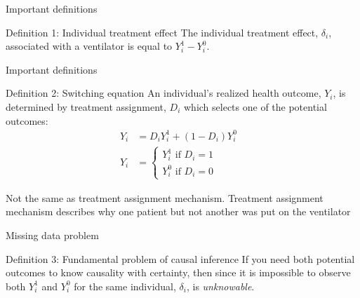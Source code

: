 \documentclass{beamer}
\begin{document}
\begin{frame}{Important definitions}

    \begin{block}{Definition 1: Individual treatment effect}
      The individual treatment effect,  $\delta_i$, associated with a ventilator is equal to $Y_i^1-Y_i^0$.
    \end{block}
\end{frame}


\begin{frame}{Important definitions}


    \begin{block}{Definition 2: Switching equation}
      An individual's realized health outcome, $Y_i$, is determined by treatment assignment, $D_i$ which selects one of the potential outcomes:
      \begin{eqnarray*}
        Y_i& = D_iY^1_i+(1-D_i)Y^0_i& \\
        Y_i& = \begin{cases}
          Y^1_i\text{ if }D_i=1 \\
          Y^0_i\text{ if }D_i=0
        \end{cases}
      \end{eqnarray*}
    \end{block}
    
    Not the same as treatment assignment mechanism.  Treatment assignment mechanism describes why one patient but not another was put on the ventilator

\end{frame}


\begin{frame}{Missing data problem}


    \begin{block}{Definition 3: Fundamental problem of causal inference}
      If you need both potential outcomes to know causality with certainty, then since it is impossible to observe both $Y_i^1$ and $Y_i^0$ for the same individual, $\delta_i$, is \emph{unknowable}.
    \end{block}
    
\end{frame}
\end{document}
